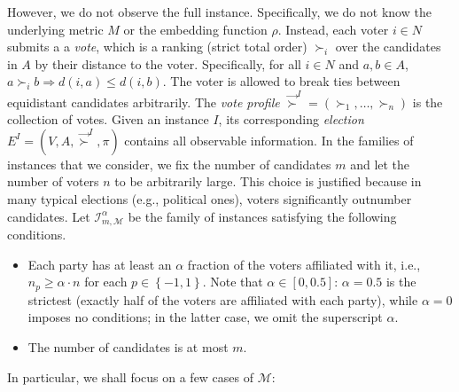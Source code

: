 \documentclass[letterpaper]{article} %
\theoremstyle{definition}
\newcommand{\set}[1]{\left\{#1\right\}}
\renewcommand{\vec}{\overrightarrow}
\newcommand{\calI}{\mathcal{I}}
\newcommand{\calM}{\mathcal{M}}
\newcommand{\vsucc}{\vec{\succ}}
\newcommand{\pleft}{-1}
\newcommand{\pright}{1}
\begin{document}
However, we do not observe the full instance. Specifically, we do not know the underlying metric $M$ or the embedding function $\rho$. Instead, each voter $i \in N$ submits a a \emph{vote}, which is a ranking (strict total order) $\succ_i$ over the candidates in $A$ by their distance to the voter. Specifically, for all $i \in N$ and $a,b \in A$, $a \succ_i b \Rightarrow d(i,a) \le d(i,b)$. The voter is allowed to break ties between equidistant candidates arbitrarily. The \emph{vote profile} $\vsucc^I = (\succ_1,\ldots,\succ_n)$ is the collection of votes. Given an instance $I$, its corresponding \emph{election} $E^I = (V,A,\vsucc^I,\pi)$ contains all observable information.
In the families of instances that we consider, we fix the number of candidates $m$ and let the number of voters $n$ to be arbitrarily large. This choice is justified because in many typical elections (e.g., political ones), voters significantly outnumber candidates. Let $\calI^{\alpha}_{m,\calM}$ be the family of instances satisfying the following conditions.
\begin{itemize}
	\item Each party has at least an $\alpha$ fraction of the voters affiliated with it, i.e., $n_p \ge \alpha \cdot n$ for each $p \in \set{\pleft,\pright}$. Note that $\alpha \in [0,0.5]$: $\alpha = 0.5$ is the strictest (exactly half of the voters are affiliated with each party), while $\alpha=0$ imposes no conditions; in the latter case, we omit the superscript $\alpha$.
	\item The number of candidates is at most $m$.%
	\end{itemize}
	In particular, we shall focus on a few cases of $\calM:$
\end{document}

